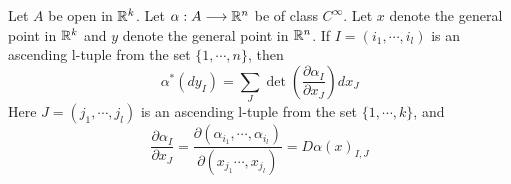 \begin{theorem}
    Let $A$ be open in $\mathbb{R}^k$. Let $\alpha:A\longrightarrow\mathbb{R}^n$ be of class $C^{\infty}$.
    Let $x$ denote the general point in $\mathbb{R}^k$ and $y$ denote the general point in $\mathbb{R}^n$. 
    If $I=(i_1,\cdots,i_l)$ is an ascending l-tuple from the set $\{1,\cdots,n\}$, then $$\alpha^*(dy_I)=\sum_J\det(\frac{\partial \alpha_I}{\partial x_J})dx_J$$
    Here $J=(j_1,\cdots,j_l)$ is an ascending l-tuple from the set $\{1,\cdots,k\}$, and 
    $$\frac{\partial \alpha_I}{\partial x_J}=\frac{\partial (\alpha_{i_1},\cdots,\alpha_{i_l})}{\partial (x_{j_1}\cdots,x_{j_l})}=D\alpha(x)_{I,J}$$
\end{theorem}